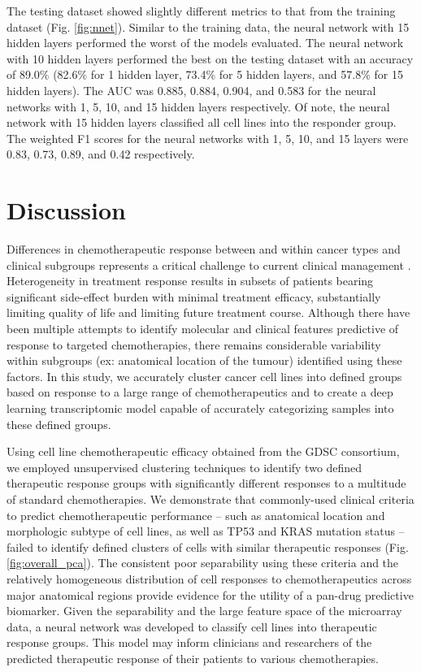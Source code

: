 \documentclass[10pt, letterpaper, twocolumn]{article}
\begin{document}
The testing dataset showed slightly different metrics to that from the training dataset (Fig. \ref{fig:nnet}). Similar to the training data, the neural network with 15 hidden layers performed the worst of the models evaluated. The neural network with 10 hidden layers performed the best on the testing dataset with an accuracy of 89.0\% (82.6\% for 1 hidden layer, 73.4\% for 5 hidden layers, and 57.8\% for 15 hidden layers). The AUC was 0.885, 0.884, 0.904, and 0.583 for the neural networks with 1, 5, 10, and 15 hidden layers respectively. Of note, the neural network with 15 hidden layers classified all cell lines into the responder group. The weighted F1 scores for the neural networks with 1, 5, 10, and 15 layers were 0.83, 0.73, 0.89, and 0.42 respectively.


\section{Discussion}
Differences in chemotherapeutic response between and within cancer types and clinical subgroups represents a critical challenge to current clinical management \cite{hetero, plasticity}. Heterogeneity in treatment response results in subsets of patients bearing significant side-effect burden with minimal treatment efficacy, substantially limiting quality of life and limiting future treatment course. Although there have been multiple attempts to identify molecular and clinical features predictive of response to targeted chemotherapies, there remains considerable variability within subgroups (ex: anatomical location of the tumour) identified using these factors. In this study, we accurately cluster cancer cell lines into defined groups based on response to a large range of chemotherapeutics and to create a deep learning transcriptomic model capable of accurately categorizing samples into these defined groups.

Using cell line chemotherapeutic efficacy obtained from the GDSC consortium, we employed unsupervised clustering techniques to identify two defined therapeutic response groups with significantly different responses to a multitude of standard chemotherapies. We demonstrate that commonly-used clinical criteria to predict chemotherapeutic performance -- such as anatomical location and morphologic subtype of cell lines, as well as TP53 and KRAS mutation status -- failed to identify defined clusters of cells with similar therapeutic responses (Fig. \ref{fig:overall_pca}). The consistent poor separability using these criteria and the relatively homogeneous distribution of cell responses to chemotherapeutics across major anatomical regions provide evidence for the utility of a pan-drug predictive biomarker. Given the separability and the large feature space of the microarray data, a neural network was developed to classify cell lines into therapeutic response groups. This model may inform clinicians and researchers of the predicted therapeutic response of their patients to various chemotherapies.
\end{document}
